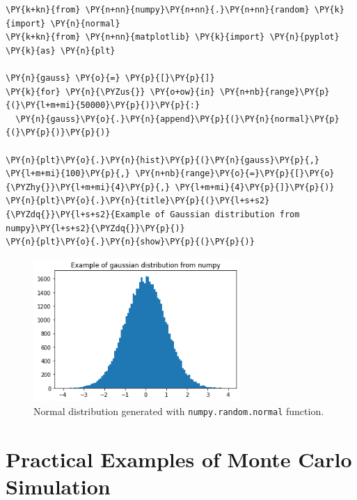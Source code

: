  \begin{tcolorbox}[breakable, size=fbox, boxrule=1pt, pad at break*=1mm,colback=cellbackground, colframe=cellborder]
\begin{Verbatim}[commandchars=\\\{\}]
\PY{k+kn}{from} \PY{n+nn}{numpy}\PY{n+nn}{.}\PY{n+nn}{random} \PY{k}{import} \PY{n}{normal}
\PY{k+kn}{from} \PY{n+nn}{matplotlib} \PY{k}{import} \PY{n}{pyplot} \PY{k}{as} \PY{n}{plt}

\PY{n}{gauss} \PY{o}{=} \PY{p}{[}\PY{p}{]}
\PY{k}{for} \PY{n}{\PYZus{}} \PY{o+ow}{in} \PY{n+nb}{range}\PY{p}{(}\PY{l+m+mi}{50000}\PY{p}{)}\PY{p}{:}
  \PY{n}{gauss}\PY{o}{.}\PY{n}{append}\PY{p}{(}\PY{n}{normal}\PY{p}{(}\PY{p}{)}\PY{p}{)}
  
\PY{n}{plt}\PY{o}{.}\PY{n}{hist}\PY{p}{(}\PY{n}{gauss}\PY{p}{,} \PY{l+m+mi}{100}\PY{p}{,} \PY{n+nb}{range}\PY{o}{=}\PY{p}{[}\PY{o}{\PYZhy{}}\PY{l+m+mi}{4}\PY{p}{,} \PY{l+m+mi}{4}\PY{p}{]}\PY{p}{)}
\PY{n}{plt}\PY{o}{.}\PY{n}{title}\PY{p}{(}\PY{l+s+s2}{\PYZdq{}}\PY{l+s+s2}{Example of Gaussian distribution from numpy}\PY{l+s+s2}{\PYZdq{}}\PY{p}{)}
\PY{n}{plt}\PY{o}{.}\PY{n}{show}\PY{p}{(}\PY{p}{)}
\end{Verbatim}
\end{tcolorbox}

 \begin{figure}
   \centering
   \includegraphics[width=0.7\textwidth]{lecture_6_files/lecture_6_32_0.png}
   \caption{Normal distribution generated with \texttt{numpy.random.normal} function.}
\label{fig:gaussian_dist}
 \end{figure}

\section{Practical Examples of Monte Carlo
Simulation}\label{example-of-monte-carlo-simulation}

